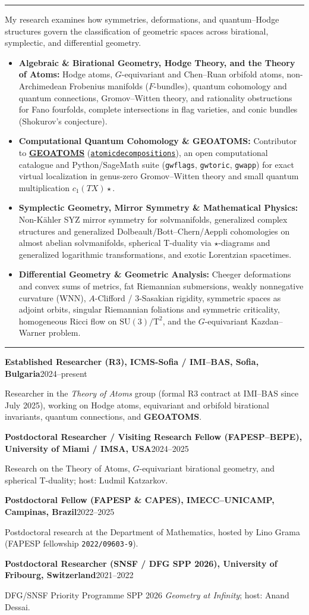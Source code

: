 \documentclass[10pt,a4paper]{article}
\newcommand{\sect}[1]{\vspace{10pt}{\large\bfseries\color{accent}#1}\par\vspace{2pt}\hrule\vspace{5pt}}
\newcommand{\entry}[2]{\par\vspace{3pt}\textbf{#1}\hfill {\small #2}\par}
\begin{document}
\sect{Research Profile \& Specialties}
My research examines how symmetries, deformations, and quantum--Hodge structures govern the classification of geometric spaces across birational, symplectic, and differential geometry.
\begin{itemize}
\item \textbf{Algebraic \& Birational Geometry, Hodge Theory, and the Theory of Atoms:} Hodge atoms, $G$-equivariant and Chen--Ruan orbifold atoms, non-Archimedean Frobenius manifolds ($F$-bundles), quantum cohomology and quantum connections, Gromov--Witten theory, and rationality obstructions for Fano fourfolds, complete intersections in flag varieties, and conic bundles (Shokurov's conjecture).
\item \textbf{Computational Quantum Cohomology \& GEOATOMS:} Contributor to \href{https://leonardofcavenaghi.github.io/atomicdecompositions/}{\textbf{GEOATOMS}} (\href{https://github.com/leonardofcavenaghi/atomicdecompositions}{\texttt{atomicdecompositions}}), an open computational catalogue and Python/SageMath suite (\texttt{gwflags}, \texttt{gwtoric}, \texttt{gwapp}) for exact virtual localization in genus-zero Gromov--Witten theory and small quantum multiplication $c_1(TX)\star$.
\item \textbf{Symplectic Geometry, Mirror Symmetry \& Mathematical Physics:} Non-K\"ahler SYZ mirror symmetry for solvmanifolds, generalized complex structures and generalized Dolbeault/Bott--Chern/Aeppli cohomologies on almost abelian solvmanifolds, spherical T-duality via $\star$-diagrams and generalized logarithmic transformations, and exotic Lorentzian spacetimes.
\item \textbf{Differential Geometry \& Geometric Analysis:} Cheeger deformations and convex sums of metrics, fat Riemannian submersions, weakly nonnegative curvature (WNN), $A$-Clifford / $3$-Sasakian rigidity, symmetric spaces as adjoint orbits, singular Riemannian foliations and symmetric criticality, homogeneous Ricci flow on $\mathrm{SU}(3)/\mathrm{T}^2$, and the $G$-equivariant Kazdan--Warner problem.
\end{itemize}

\sect{Academic Appointments}
\entry{Established Researcher (R3), ICMS-Sofia / IMI--BAS, Sofia, Bulgaria}{2024--present}
Researcher in the \emph{Theory of Atoms} group (formal R3 contract at IMI--BAS since July 2025), working on Hodge atoms, equivariant and orbifold birational invariants, quantum connections, and \textbf{GEOATOMS}.
\entry{Postdoctoral Researcher / Visiting Research Fellow (FAPESP--BEPE), University of Miami / IMSA, USA}{2024--2025}
Research on the Theory of Atoms, $G$-equivariant birational geometry, and spherical T-duality; host: Ludmil Katzarkov.
\entry{Postdoctoral Fellow (FAPESP \& CAPES), IMECC--UNICAMP, Campinas, Brazil}{2022--2025}
Postdoctoral research at the Department of Mathematics, hosted by Lino Grama (FAPESP fellowship \texttt{2022/09603-9}).
\entry{Postdoctoral Researcher (SNSF / DFG SPP 2026), University of Fribourg, Switzerland}{2021--2022}
DFG/SNSF Priority Programme SPP 2026 \emph{Geometry at Infinity}; host: Anand Dessai.
\end{document}
